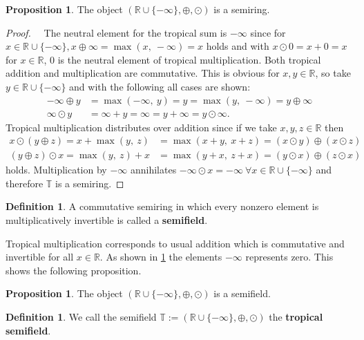 \documentclass{article}
\theoremstyle{definition}
\newtheorem{definition}[theorem]{Definition}
\newtheorem{proposition}[theorem]{Proposition}
\begin{document}
\begin{proposition}
\label{prop:trop_semiring}
The object $( \mathbb{R} \cup \{- \infty \} , \oplus , \odot )$ is a semiring. \cite[p.~10]{maclagan2015introduction}
\end{proposition}
\begin{proof}
~\
The neutral element for the tropical sum is $- \infty$ since for $x \in \mathbb{R} \cup \{- \infty \}, x \oplus \infty = \max(x,\ - \infty) = x$ holds and with $x \odot 0 = x + 0 = x$ for $x \in \mathbb{R}$, $0$ is the neutral element of tropical multiplication. Both tropical addition and multiplication are commutative. This is obvious for $x,y \in \mathbb{R}$, so take $y \in \mathbb{R} \cup \{- \infty \}$ and with the following all cases are shown:
\begin{align*}
- \infty \oplus y &= \max (- \infty ,\ y) =   y = \max ( y,\ - \infty ) = y \oplus \infty \\
\infty \odot y &= \infty +y = \infty = y+ \infty = y \odot \infty.
\end{align*}
Tropical multiplication distributes over addition since if we take $x, y, z \in \mathbb{R}$ then
\begin{align*}
x \odot (y \oplus z) = x + \max (y,\ z) &=   \max (x + y,\ x + z) = (x \odot y) \oplus (x \odot z) \\
(y \oplus z) \odot x = \max (y,\ z) + x &=   \max (y + x,\ z + x) = (y \odot x) \oplus (z \odot x)
\end{align*}
holds. Multiplication by $- \infty$ annihilates $- \infty \odot x = - \infty \: \forall x \in  \mathbb{R} \cup \{- \infty \}$ and therefore $\mathbb{T}$ is a semiring.
\end{proof}

\begin{definition}\cite{olia2020analysis}
A commutative semiring in which every nonzero element is multiplicatively invertible is called a \textbf{semifield}.
\end{definition}

Tropical multiplication corresponds to usual addition which is commutative and invertible for all $x \in \mathbb{R}$. As shown in \ref{prop:trop_semiring} the elements $-\infty$ represents zero. This shows the following proposition.
\begin{proposition}
The object $( \mathbb{R} \cup \{- \infty \} , \oplus , \odot )$ is a semifield.
\end{proposition}

\begin{definition}
We call the semifield $\mathbb{T} := ( \mathbb{R} \cup \{- \infty \} , \oplus , \odot )$ the \textbf{tropical semifield}.
\end{definition}
\end{document}
